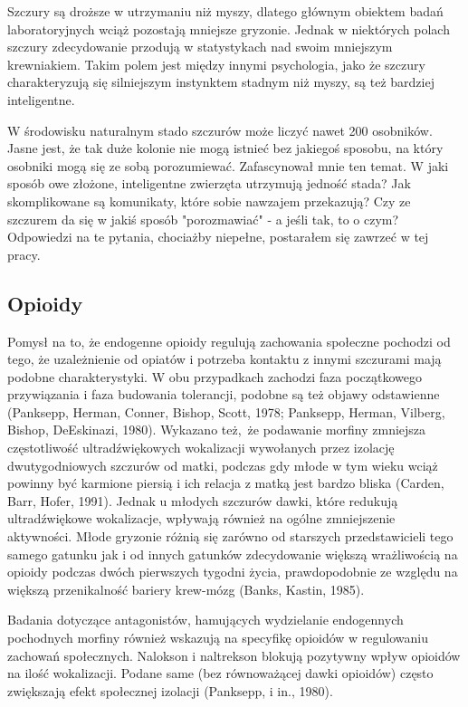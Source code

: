 \documentclass{psychol}
\begin{document}
Szczury są droższe w utrzymaniu niż myszy, dlatego głównym obiektem badań laboratoryjnych wciąż pozostają mniejsze gryzonie. Jednak w niektórych polach szczury zdecydowanie przodują w statystykach nad swoim mniejszym krewniakiem. Takim polem jest między innymi psychologia, jako że szczury charakteryzują się silniejszym instynktem stadnym niż myszy, są też bardziej inteligentne.

\pagebreak

W środowisku naturalnym stado szczurów może liczyć nawet 200 osobników. Jasne jest, że tak duże kolonie nie mogą istnieć bez jakiegoś sposobu, na który osobniki mogą się ze sobą porozumiewać. Zafascynował mnie ten temat. W jaki sposób owe złożone, inteligentne zwierzęta utrzymują jedność stada? Jak skomplikowane są komunikaty, które sobie nawzajem przekazują? Czy ze szczurem da się w jakiś sposób "porozmawiać" - a jeśli tak, to o czym? Odpowiedzi na te pytania, chociażby niepełne, postarałem się zawrzeć w tej pracy.


\subsection{Opioidy}

Pomysł na to, że endogenne opioidy regulują zachowania społeczne pochodzi od tego, że uzależnienie od opiatów i potrzeba kontaktu z innymi szczurami mają podobne charakterystyki. W obu przypadkach zachodzi faza początkowego przywiązania i faza budowania tolerancji, podobne są też objawy odstawienne (Panksepp, Herman, Conner, Bishop, Scott, 1978; Panksepp, Herman, Vilberg, Bishop, DeEskinazi, 1980). Wykazano też, że podawanie morfiny zmniejsza częstotliwość ultradźwiękowych wokalizacji wywołanych przez izolację dwutygodniowych szczurów od matki, podczas gdy młode w tym wieku wciąż powinny być karmione piersią i ich relacja z matką jest bardzo bliska (Carden, Barr, Hofer, 1991).
Jednak u młodych szczurów dawki, które redukują ultradźwiękowe wokalizacje, wpływają również na ogólne zmniejszenie aktywności. Młode gryzonie różnią się zarówno od starszych przedstawicieli tego samego gatunku jak i od innych gatunków zdecydowanie większą wrażliwością na opioidy podczas dwóch pierwszych tygodni życia, prawdopodobnie ze względu na większą przenikalność bariery krew-mózg (Banks, Kastin, 1985).

Badania dotyczące antagonistów, hamujących wydzielanie endogennych pochodnych morfiny również wskazują na specyfikę opioidów w regulowaniu zachowań społecznych. Nalokson i naltrekson blokują pozytywny wpływ opioidów na ilość wokalizacji. Podane same (bez równoważącej dawki opioidów) często zwiększają efekt społecznej izolacji (Panksepp, i in., 1980).
\end{document}
